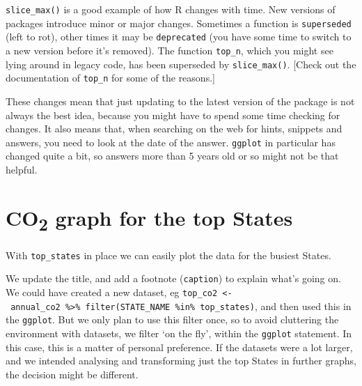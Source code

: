 \documentclass[
]{book}
\begin{document}
\texttt{slice\_max()} is a good example of how R changes with time. New versions of packages introduce minor or major changes. Sometimes a function is \texttt{superseded} (left to rot), other times it may be \texttt{deprecated} (you have some time to switch to a new version before it's removed). The function \texttt{top\_n}, which you might see lying around in legacy code, has been superseded by \texttt{slice\_max()}. {[}Check out the documentation of \texttt{top\_n} for some of the reasons.{]}

These changes mean that just updating to the latest version of the package is not always the best idea, because you might have to spend some time checking for changes. It also means that, when searching on the web for hints, snippets and answers, you need to look at the date of the answer. \texttt{ggplot} in particular has changed quite a bit, so answers more than 5 years old or so might not be that helpful.

\hypertarget{co2-graph-for-the-top-states}{%
\section{\texorpdfstring{CO\textsubscript{2} graph for the top States}{CO2 graph for the top States}}\label{co2-graph-for-the-top-states}}

With \texttt{top\_states} in place we can easily plot the data for the busiest States.

We update the title, and add a footnote (\texttt{caption}) to explain what's going on. We could have created a new dataset, eg \texttt{top\_co2\ \textless{}-\ annual\_co2\ \%\textgreater{}\%\ filter(STATE\_NAME\ \%in\%\ top\_states)}, and then used this in the \texttt{ggplot}. But we only plan to use this filter once, so to avoid cluttering the environment with datasets, we filter `on the fly', within the \texttt{ggplot} statement. In this case, this is a matter of personal preference. If the datasets were a lot larger, and we intended analysing and transforming just the top States in further graphs, the decision might be different.
\end{document}
